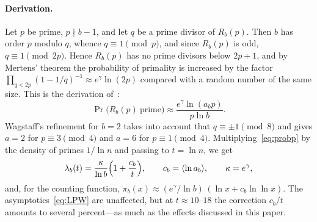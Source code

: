 \documentclass[11pt,a4paper]{article}
\theoremstyle{plain}
\theoremstyle{remark}
\newcommand{\Rb}{R_b}
\newcommand{\eg}{e^{\gamma}}
\begin{document}
\paragraph{Derivation.} Let $p$ be prime, $p\nmid b-1$, and let $q$ be a prime
divisor of $\Rb(p)$. Then $b$ has order $p$ modulo $q$, whence $q\equiv1\pmod p$,
and since $\Rb(p)$ is odd, $q\equiv1\pmod{2p}$. Hence $\Rb(p)$ has no prime
divisors below $2p+1$, and by Mertens' theorem the probability of primality is
increased by the factor $\prod_{q<2p}(1-1/q)^{-1}\approx\eg\ln(2p)$ compared with
a random number of the same size. This is the derivation
of~\cite{wagstaff1983,t5k}:
\begin{equation}\label{eq:probp}
\Pr\bigl(\Rb(p)\ \text{prime}\bigr)\approx\frac{\eg\ln(a_bp)}{p\ln b}.
\end{equation}
Wagstaff's refinement for $b=2$ takes into account that $q\equiv\pm1\pmod8$ and
gives $a=2$ for $p\equiv3\pmod4$ and $a=6$ for $p\equiv1\pmod4$.
Multiplying~\eqref{eq:probp} by the density of primes $1/\ln n$ and passing to
$t=\ln n$, we get
\begin{equation}\label{eq:lam2}
\lambda_b(t)=\frac{\kappa}{\ln b}\Bigl(1+\frac{c_b}{t}\Bigr),\qquad
c_b=\langle\ln a_b\rangle,\qquad \kappa=\eg,
\end{equation}
and, for the counting function,
$\pi_b(x)\approx(\eg/\ln b)\,(\ln x+c_b\ln\ln x)$. The
asymptotics~\eqref{eq:LPW} are unaffected, but at $t\approx10$--$18$ the
correction $c_b/t$ amounts to several percent---as much as the effects
discussed in this paper.
\end{document}
